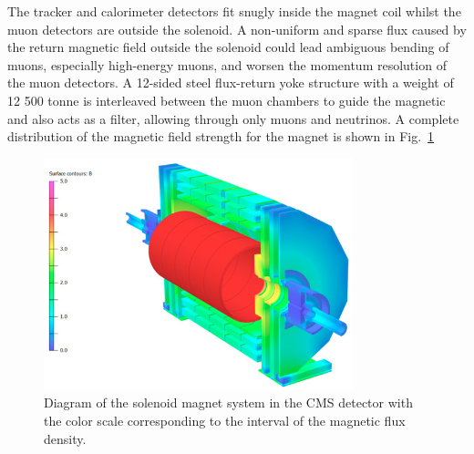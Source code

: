 The tracker and calorimeter detectors fit snugly inside the magnet coil whilst the muon detectors are outside the solenoid.
A non-uniform and sparse flux caused by the return magnetic field outside the solenoid could lead ambiguous bending of muons, especially high-energy muons, and worsen the momentum resolution of the muon detectors.
A 12-sided steel flux-return yoke structure with a weight of 12 500 tonne is interleaved between the muon chambers to guide the magnetic and also acts as a filter, allowing through only muons and neutrinos. 
A complete distribution of the magnetic field strength for the magnet is shown in Fig.~\ref{fig:cms_magnet}
\begin{figure}\centering
    \includegraphics[width=0.8\textwidth]{figure/cms_magnet.jpg}
    \caption[Diagram of the solenoid magnet system in the CMS detector.]
    {Diagram of the solenoid magnet system in the CMS detector with the color scale corresponding to the interval of the magnetic flux density.}
    \label{fig:cms_magnet}
\end{figure}

